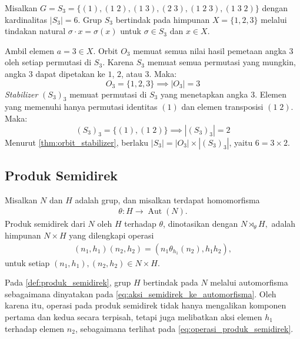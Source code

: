 \begin{contoh}
  Misalkan $G = S_3 = \{(1), (1\;2), (1\;3), (2\;3), (1\;2\;3), (1\;3\;2)\}$ dengan kardinalitas $|S_3| = 6$. Grup $S_3$ bertindak pada himpunan $X = \{1, 2, 3\}$ melalui tindakan natural $\sigma\cdot x = \sigma(x)$ untuk $\sigma \in S_3$ dan $x \in X$.

  \noindent Ambil elemen $a = 3 \in X$. Orbit $O_3$ memuat semua nilai hasil pemetaan angka $3$ oleh setiap permutasi di $S_3$. Karena $S_3$ memuat semua permutasi yang mungkin, angka $3$ dapat dipetakan ke $1$, $2$, atau $3$. Maka:
  \[
    O_3 = \{1, 2, 3\} \implies |O_3| = 3
  \]
  \emph{Stabilizer} $(S_3)_3$ memuat permutasi di $S_3$ yang menetapkan angka $3$. Elemen yang memenuhi hanya permutasi identitas $(1)$ dan elemen transposisi $(1\;2)$. Maka:
  \[
    (S_3)_3 = \{(1), (1\;2)\} \implies |(S_3)_3| = 2
  \]
  Menurut \autoref{thm:orbit_stabilizer}, berlaku $|S_3| = |O_3| \times |(S_3)_3|$, yaitu $6 = 3 \times 2$.
\end{contoh}

\subsection{Produk Semidirek}

\begin{definisi}\label{def:produk_semidirek}
  Misalkan $N$ dan $H$ adalah grup, dan misalkan terdapat homomorfisma
  \begin{align}\label{eq:aksi_semidirek_ke_automorfisma}
    \theta:H\to \operatorname{Aut}(N).
  \end{align}
  Produk semidirek dari $N$ oleh $H$ terhadap $\theta$, dinotasikan dengan
  $
    N\rtimes_\theta H,
  $
  adalah himpunan $N\times H$ yang dilengkapi operasi
  \begin{align}\label{eq:operasi_produk_semidirek}
    (n_1,h_1)(n_2,h_2)
    =
    (n_1\theta_{h_1}(n_2),h_1h_2),
  \end{align}
  untuk setiap $(n_1,h_1),(n_2,h_2)\in N\times H$.
\end{definisi}

Pada \autoref{def:produk_semidirek}, grup $H$ bertindak pada $N$ melalui automorfisma sebagaimana dinyatakan pada \eqref{eq:aksi_semidirek_ke_automorfisma}. Oleh karena itu, operasi pada produk semidirek tidak hanya mengalikan komponen pertama dan kedua secara terpisah, tetapi juga melibatkan aksi elemen $h_1$ terhadap elemen $n_2$, sebagaimana terlihat pada \eqref{eq:operasi_produk_semidirek}.

